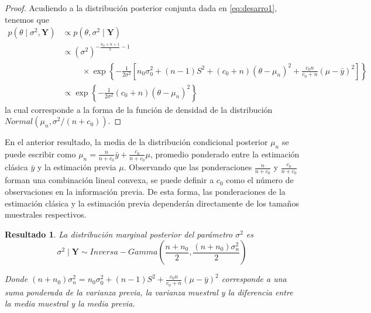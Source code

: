 \documentclass[
  10pt,
  spanish,
]{book}
\newtheorem{proposition}{Resultado}[chapter]
\theoremstyle{definition}
\theoremstyle{definition}
\theoremstyle{definition}
\theoremstyle{definition}
\theoremstyle{remark}
\begin{document}
\begin{proof}
{}Acudiendo a la distribución posterior conjunta dada en \eqref{eq:desarro1}, tenemos que
\begin{align*}
p(\theta \mid \sigma^2,\mathbf{Y})&\propto 
p(\theta,\sigma^2 \mid \mathbf{Y}) \\
&\propto(\sigma^2)^{-\frac{n_0+n+1}{2}-1}\\
&\hspace{1cm}\times
\exp\left\{-\frac{1}{2\sigma^2}\left[n_0\sigma^2_0+(n-1)S^2+(c_0+n)(\theta-\mu_n)^2+\frac{c_0n}{c_0+n}(\mu-\bar{y})^2\right]\right\}\\
&\propto \exp\left\{-\frac{1}{2\sigma^2}(c_0+n)(\theta-\mu_n)^2\right\}
\end{align*}
la cual corresponde a la forma de la función de densidad de la distribución \(Normal(\mu_n, \sigma^2/(n+c_0))\).
\end{proof}

En el anterior resultado, la media de la distribución condicional posterior \(\mu_n\) se puede escribir como \(\mu_n=\frac{n}{n+c_0}\bar{y}+\frac{c_0}{n+c_0}\mu\), promedio ponderado entre la estimación clásica \(\bar{y}\) y la estimación previa \(\mu\). Observando que las ponderaciones \(\frac{n}{n+c_0}\) y \(\frac{c_0}{n+c_0}\) forman una combinación lineal convexa, se puede definir a \(c_0\) como el número de observaciones en la información previa. De esta forma, las ponderaciones de la estimación clásica y la estimación previa dependerán directamente de los tamaños muestrales respectivos.

\begin{proposition}
\protect\hypertarget{prp:PosterSigma2IG}{}{\label{prp:PosterSigma2IG} }La distribución marginal posterior del parámetro \(\sigma^2\) es
\begin{equation*}
\sigma^2 \mid \mathbf{Y} \sim Inversa-Gamma\left(\frac{n+n_0}{2},\frac{(n+n_0)\sigma^2_n}{2}\right)
\end{equation*}

Donde \((n+n_0)\sigma^2_n=n_0\sigma^2_0+(n-1)S^2+\frac{c_0n}{c_0+n}(\mu-\bar{y})^2\) corresponde a una suma ponderada de la varianza previa, la varianza muestral y la diferencia entre la media muestral y la media previa.
\end{proposition}
\end{document}
